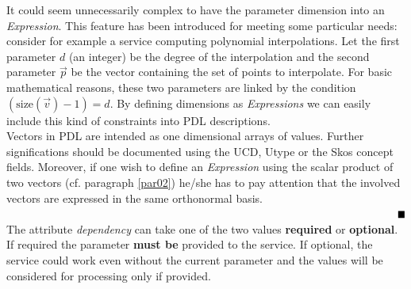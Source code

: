 \documentclass[a4paper,11pt] {ivoa}
\begin{document}
 It could seem unnecessarily complex to have the parameter dimension into an {\it Expression}. This feature has been introduced for meeting some particular needs: consider for example a service computing polynomial interpolations. Let the first parameter $d$ (an integer) be the degree of the interpolation and the second parameter  $\vec p$ be the vector containing the set of points to interpolate. For basic mathematical reasons, these two parameters are linked by the condition $(\mbox{size}(\vec v)-1) = d$. By defining dimensions as {\it Expressions} we can easily include this kind of constraints into PDL descriptions.\\
Vectors in PDL are intended as one dimensional arrays of values. Further significations should be documented using the UCD, Utype or the Skos concept fields. Moreover, if one wish to define an {\it Expression} using the scalar product of two vectors (cf. paragraph \ref{par02}) he/she has to pay attention that the involved vectors are expressed in the same orthonormal basis.\\
$\mbox{\hspace{14.3cm}} \blacksquare$\\

The attribute {\it dependency} can take one of the two values {\bf required} or {\bf
optional}. If required the parameter {\bf must be} provided to the service. If optional, the service
could work even without the current parameter and the values will be considered for processing only
if provided.\\
\end{document}
